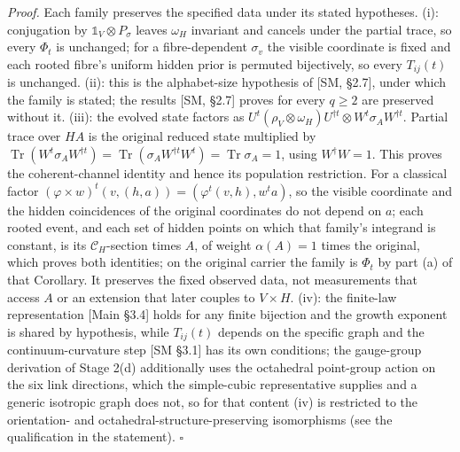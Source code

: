 \documentclass[
]{article}
\begin{document}
\emph{Proof.} Each family preserves the specified data under its stated
hypotheses. (i): conjugation by \(\mathbb{1}_V \otimes P_\sigma\) leaves
\(\omega_H\) invariant and cancels under the partial trace, so every
\(\Phi_t\) is unchanged; for a fibre-dependent \(\sigma_v\) the visible
coordinate is fixed and each rooted fibre's uniform hidden prior is
permuted bijectively, so every \(T_{ij}(t)\) is unchanged. (ii): this is
the alphabet-size hypothesis of {[}SM, §2.7{]}, under which the family
is stated; the results {[}SM, §2.7{]} proves for every \(q \geq 2\) are
preserved without it. (iii): the evolved state factors as
\(U^t(\rho_V\otimes\omega_H)U^{\dagger t}\otimes W^t\sigma_AW^{\dagger t}\).
Partial trace over \(H A\) is the original reduced state multiplied by
\(\operatorname{Tr}(W^t\sigma_AW^{\dagger t})=\operatorname{Tr}(\sigma_AW^{\dagger t}W^t)=\operatorname{Tr}\sigma_A=1\),
using \(W^\dagger W=1\). This proves the coherent-channel identity and
hence its population restriction. For a classical factor
\((\varphi\times w)^t(v,(h,a))=(\varphi^t(v,h),w^t a)\), so the visible
coordinate and the hidden coincidences of the original coordinates do
not depend on \(a\); each rooted event, and each set of hidden points on
which that family's integrand is constant, is its
\(\mathcal C_H\)-section times \(A\), of weight \(\alpha(A)=1\) times
the original, which proves both identities; on the original carrier the
family is \(\Phi_t\) by part (a) of that Corollary. It preserves the
fixed observed data, not measurements that access \(A\) or an extension
that later couples to \(V\times H\). (iv): the finite-law representation
{[}Main §3.4{]} holds for any finite bijection and the growth exponent
is shared by hypothesis, while \(T_{ij}(t)\) depends on the specific
graph and the continuum-curvature step {[}SM §3.1{]} has its own
conditions; the gauge-group derivation of Stage 2(d) additionally uses
the octahedral point-group action on the six link directions, which the
simple-cubic representative supplies and a generic isotropic graph does
not, so for that content (iv) is restricted to the orientation- and
octahedral-structure-preserving isomorphisms (see the qualification in
the statement). \(\square\)
\end{document}
